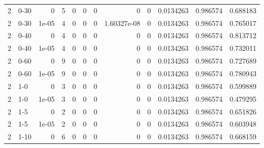 \begin{tabular}{rlrrrrrrrrrr}
     2 & 0-30   &      0     &           5 &                 0 &                 0 &     0           &     0           &      0           &        0.0134263 &               0.986574 &           0.688183 \\
     2 & 0-30   &      1e-05 &           4 &                 0 &                 0 &     0           &     1.60327e-08 &      0           &        0.0134263 &               0.986574 &           0.765017 \\
     2 & 0-40   &      0     &           4 &                 0 &                 0 &     0           &     0           &      0           &        0.0134263 &               0.986574 &           0.813712 \\
     2 & 0-40   &      1e-05 &           4 &                 0 &                 0 &     0           &     0           &      0           &        0.0134263 &               0.986574 &           0.732011 \\
     2 & 0-60   &      0     &           9 &                 0 &                 0 &     0           &     0           &      0           &        0.0134263 &               0.986574 &           0.727689 \\
     2 & 0-60   &      1e-05 &           9 &                 0 &                 0 &     0           &     0           &      0           &        0.0134263 &               0.986574 &           0.780943 \\
     2 & 1-0    &      0     &           3 &                 0 &                 0 &     0           &     0           &      0           &        0.0134263 &               0.986574 &           0.599889 \\
     2 & 1-0    &      1e-05 &           3 &                 0 &                 0 &     0           &     0           &      0           &        0.0134263 &               0.986574 &           0.479295 \\
     2 & 1-5    &      0     &           2 &                 0 &                 0 &     0           &     0           &      0           &        0.0134263 &               0.986574 &           0.651826 \\
     2 & 1-5    &      1e-05 &           2 &                 0 &                 0 &     0           &     0           &      0           &        0.0134263 &               0.986574 &           0.603948 \\
     2 & 1-10   &      0     &           6 &                 0 &                 0 &     0           &     0           &      0           &        0.0134263 &               0.986574 &           0.668159 \\

\end{tabular}
